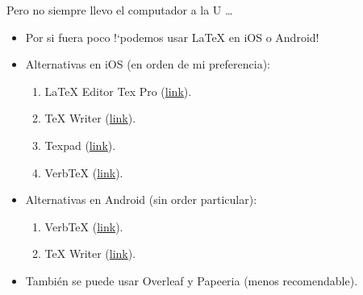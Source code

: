 \documentclass[11pt, handout]{beamer}
\begin{document}
\begin{frame}{Pero no siempre llevo el computador a la U \ldots}
	
	\begin{itemize}
		\item Por si fuera poco !`podemos usar {\LaTeX} en iOS o Android!\pause
		\vfill
		
		\item Alternativas en iOS (en orden de mi preferencia):\smallskip
			\begin{enumerate}
				\item LaTeX Editor Tex Pro (\href{https://apps.apple.com/cl/app/latex-editor-tex-pro/id1486802741?l=en}{link}).\smallskip
				\item TeX Writer (\href{https://apps.apple.com/cl/app/tex-writer-latex-on-the-go/id552717222?l=en}{link}).\smallskip
				\item Texpad (\href{https://apps.apple.com/cl/app/texpad-latex-editor/id550419159?l=en}{link}).\smallskip
				\item VerbTeX (\href{https://apps.apple.com/cl/app/verbtex-latex-editor/id560869163?l=en}{link}).\pause
			\end{enumerate}
		\vfill
			
		\item Alternativas en Android (sin order particular):\smallskip
			\begin{enumerate}
				\item VerbTeX (\href{https://play.google.com/store/apps/details?id=verbosus.verbtexpro}{link}).\smallskip
				\item TeX Writer (\href{https://play.google.com/store/apps/details?id=com.litchie.texwriter}{link}).\pause
			\end{enumerate}
		\vfill
		
		\item También se puede usar Overleaf y Papeeria (menos recomendable). 
		
	\end{itemize}
\end{frame}
\end{document}
